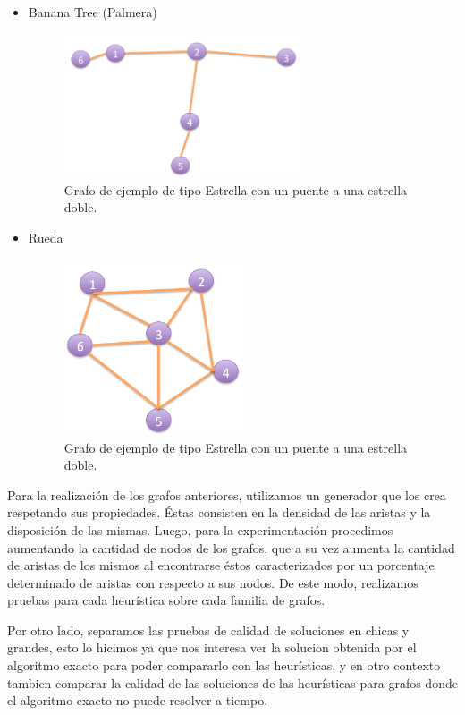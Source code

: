\begin{itemize}
\item Banana Tree (Palmera)
 \begin{figure}[H] %
\begin{center}
\includegraphics[width=200pt]{../imgs/banana.jpg}
\caption{Grafo de ejemplo de tipo Estrella con un puente a una estrella doble.}
\end{center}
\end{figure}
\item Rueda
 \begin{figure}[H] %
\begin{center}
\includegraphics[width=150pt]{../imgs/rueda.jpg}
\caption{Grafo de ejemplo de tipo Estrella con un puente a una estrella doble.}
\end{center}
\end{figure}


\end{itemize}
Para la realización de los grafos anteriores, utilizamos un generador que los crea respetando sus propiedades. Éstas consisten en la densidad de las aristas y la disposición de las mismas. Luego, para la experimentación procedimos aumentando la cantidad de nodos de los grafos, que a su vez aumenta la cantidad de aristas de los mismos al encontrarse éstos caracterizados por un porcentaje determinado de aristas con respecto a sus nodos. De este modo, realizamos pruebas para cada heurística sobre cada familia de grafos.

Por otro lado, separamos las pruebas de calidad de soluciones en chicas y grandes, esto lo hicimos ya que nos interesa ver la solucion obtenida por el algoritmo exacto para poder compararlo con las heurísticas, y en otro contexto tambien comparar la calidad de las soluciones de las heurísticas para grafos donde el algoritmo exacto no puede resolver a tiempo. 

